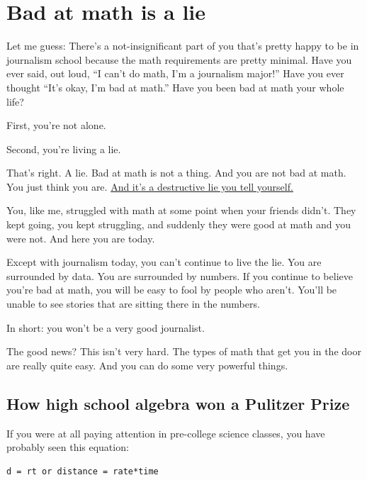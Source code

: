 \documentclass[
]{book}
\begin{document}
\hypertarget{bad-at-math-is-a-lie}{%
\chapter{Bad at math is a lie}\label{bad-at-math-is-a-lie}}

Let me guess: There's a not-insignificant part of you that's pretty happy to be in journalism school because the math requirements are pretty minimal. Have you ever said, out loud, ``I can't do math, I'm a journalism major!'' Have you ever thought ``It's okay, I'm bad at math.'' Have you been bad at math your whole life?

First, you're not alone.

Second, you're living a lie.

That's right. A lie. Bad at math is not a thing. And you are not bad at math. You just think you are. \href{http://www.niemanlab.org/2013/11/matt-waite-how-i-faced-my-fears-and-learned-to-be-good-at-math/}{And it's a destructive lie you tell yourself.}

You, like me, struggled with math at some point when your friends didn't. They kept going, you kept struggling, and suddenly they were good at math and you were not. And here you are today.

Except with journalism today, you can't continue to live the lie. You are surrounded by data. You are surrounded by numbers. If you continue to believe you're bad at math, you will be easy to fool by people who aren't. You'll be unable to see stories that are sitting there in the numbers.

In short: you won't be a very good journalist.

The good news? This isn't very hard. The types of math that get you in the door are really quite easy. And you can do some very powerful things.

\hypertarget{how-high-school-algebra-won-a-pulitzer-prize}{%
\section{How high school algebra won a Pulitzer Prize}\label{how-high-school-algebra-won-a-pulitzer-prize}}

If you were at all paying attention in pre-college science classes, you have probably seen this equation:

\begin{verbatim}
d = rt or distance = rate*time
\end{verbatim}
\end{document}
